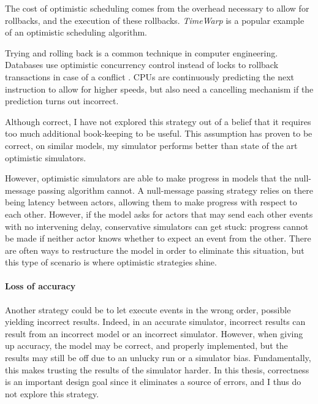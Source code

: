 The cost of optimistic scheduling comes from the overhead necessary to allow for rollbacks, and the execution of these rollbacks.
\emph{TimeWarp} \cite{jefferson_virtual_1985} is a popular example of an optimistic scheduling algorithm.

Trying and rolling back is a common technique in computer engineering.
Databases use optimistic concurrency control instead of locks to rollback transactions in case of a conflict \cite{dragojevic_no_2015}.
CPUs are continuously predicting the next instruction to allow for higher speeds, but also need a cancelling mechanism if the prediction turns out incorrect.

Although correct, I have not explored this strategy out of a belief that it requires too much additional book-keeping to be useful.
This assumption has proven to be correct, on similar models, my simulator performs better than state of the art optimistic simulators. 

However, optimistic simulators are able to make progress in models that the null-message passing algorithm cannot.
A null-message passing strategy relies on there being latency between actors, allowing them to make progress with respect to each other.
However, if the model asks for actors that may send each other events with no intervening delay, conservative simulators can get stuck: progress cannot be made if neither actor knows whether to expect an event from the other.
There are often ways to restructure the model in order to eliminate this situation, but this type of scenario is where optimistic strategies shine.

\paragraph{Loss of accuracy}
Another strategy could be to let execute events in the wrong order, possible yielding incorrect results. 
Indeed, in an accurate simulator, incorrect results can result from an incorrect model or an incorrect simulator.
However, when giving up accuracy, the model may be correct, and properly implemented, but the results may still be off due to an unlucky run or a simulator bias.
Fundamentally, this makes trusting the results of the simulator harder.
In this thesis, correctness is an important design goal since it eliminates a source of errors, and I thus do not explore this strategy.
